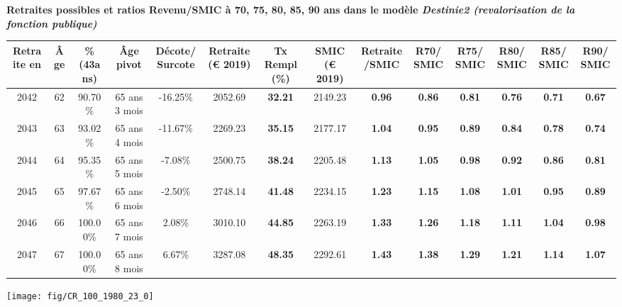  \vspace{0.1cm} 
{\bf \noindent Retraites possibles et ratios Revenu/SMIC à 70, 75, 80, 85, 90 ans dans le modèle \emph{Destinie2 (revalorisation de la fonction publique)}}  
 
\begin{adjustbox}{max width=\textwidth} 
\begin{tabular}[htb]{|c|c||c|c|c||c|c||c|c||c|c|c|c|c|} 
\hline 
 Retraite en &  Âge &  \%(43ans) &  Âge pivot &  Décote/Surcote &  Retraite (\euro{} 2019) &  Tx Rempl(\%) &  SMIC (\euro{} 2019) &  Retraite/SMIC &  R70/SMIC &  R75/SMIC &  R80/SMIC &  R85/SMIC &  R90/SMIC \\ 
\hline \hline 
 2042 &  62 &  90.70\% &  65 ans 3 mois &  -16.25\% &  2052.69 &  {\bf 32.21} &  2149.23 &  {\bf {\color{red} 0.96}} &  {\bf {\color{red} 0.86}} &  {\bf {\color{red} 0.81}} &  {\bf {\color{red} 0.76}} &  {\bf {\color{red} 0.71}} &  {\bf {\color{red} 0.67}} \\ 
\hline 
 2043 &  63 &  93.02\% &  65 ans 4 mois &  -11.67\% &  2269.23 &  {\bf 35.15} &  2177.17 &  {\bf 1.04} &  {\bf {\color{red} 0.95}} &  {\bf {\color{red} 0.89}} &  {\bf {\color{red} 0.84}} &  {\bf {\color{red} 0.78}} &  {\bf {\color{red} 0.74}} \\ 
\hline 
 2044 &  64 &  95.35\% &  65 ans 5 mois &  -7.08\% &  2500.75 &  {\bf 38.24} &  2205.48 &  {\bf 1.13} &  {\bf 1.05} &  {\bf {\color{red} 0.98}} &  {\bf {\color{red} 0.92}} &  {\bf {\color{red} 0.86}} &  {\bf {\color{red} 0.81}} \\ 
\hline 
 2045 &  65 &  97.67\% &  65 ans 6 mois &  -2.50\% &  2748.14 &  {\bf 41.48} &  2234.15 &  {\bf 1.23} &  {\bf 1.15} &  {\bf 1.08} &  {\bf 1.01} &  {\bf {\color{red} 0.95}} &  {\bf {\color{red} 0.89}} \\ 
\hline 
 2046 &  66 &  100.00\% &  65 ans 7 mois &  2.08\% &  3010.10 &  {\bf 44.85} &  2263.19 &  {\bf 1.33} &  {\bf 1.26} &  {\bf 1.18} &  {\bf 1.11} &  {\bf 1.04} &  {\bf {\color{red} 0.98}} \\ 
\hline 
 2047 &  67 &  100.00\% &  65 ans 8 mois &  6.67\% &  3287.08 &  {\bf 48.35} &  2292.61 &  {\bf 1.43} &  {\bf 1.38} &  {\bf 1.29} &  {\bf 1.21} &  {\bf 1.14} &  {\bf 1.07} \\ 
\hline 
\hline 
\end{tabular} 
\end{adjustbox} 
 
 \vspace{0.1cm} 

 {\hspace{-2.2cm}\texttt{[image: fig/CR\_100\_1980\_23\_0]}} 

